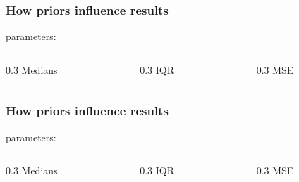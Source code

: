 \documentclass[aspectratio=169]{beamer}
\begin{document}
\begin{frame}
	\frametitle{How priors influence results}


  \vspace{1.5em}

	 parameters:

  \vspace{1em}

	\begin{columns}
		\begin{column}{0.3\textwidth}
			\centering Medians
			
		\end{column}
		\begin{column}{0.3\textwidth}
			\centering IQR
			
		\end{column}
		\begin{column}{0.3\textwidth}
			\centering MSE
			
		\end{column}
	\end{columns}
\end{frame}

\begin{frame}
	\frametitle{How priors influence results}


  \vspace{1.5em}

	 parameters:

  \vspace{1em}

	\begin{columns}
		\begin{column}{0.3\textwidth}
			\centering Medians
			
		\end{column}
		\begin{column}{0.3\textwidth}
			\centering IQR
			
		\end{column}
		\begin{column}{0.3\textwidth}
			\centering MSE
			
		\end{column}
	\end{columns}
\end{frame}
\end{document}
